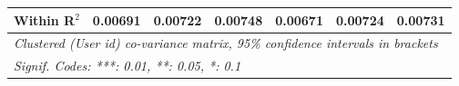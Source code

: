 \begin{table}[htbp]
\begin{threeparttable}[b]
\begin{tabular}{lcccccc}
         Within R$^2$                   & 0.00691         & 0.00722         & 0.00748         & 0.00671          & 0.00724          & 0.00731\\  
         \midrule \midrule
         \multicolumn{7}{l}{\emph{Clustered (User id) co-variance matrix, 95\% confidence intervals in brackets}}\\
         \multicolumn{7}{l}{\emph{Signif. Codes: ***: 0.01, **: 0.05, *: 0.1}}\\
      \end{tabular}
   \end{threeparttable}
\end{table}


